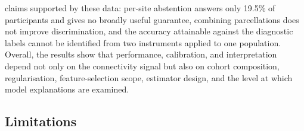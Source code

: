 claims supported by these data: per-site abstention answers only 19.5\% of participants and gives no broadly useful guarantee, combining parcellations does not improve discrimination, and the accuracy attainable against the diagnostic labels cannot be identified from two instruments applied to one population. Overall, the results show that performance, calibration, and interpretation depend not only on the connectivity signal but also on cohort composition, regularisation, feature-selection scope, estimator design, and the level at which model explanations are examined.

\subsection{Limitations}
\label{subsec:limitations}

